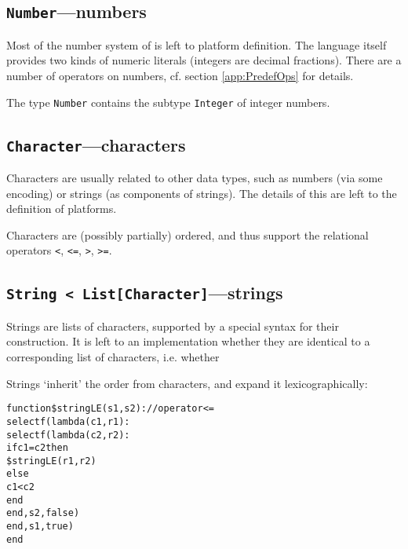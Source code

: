 
\subsection{{\tt Number}---numbers}\label{sect:Numbers}


Most of the number system of \Cal is left to
platform definition. The language itself provides two kinds of
numeric literals (integers are decimal fractions). There are a number
of operators on numbers, cf. section \ref{app:PredefOps} for details.



The type {\tt Number} contains the subtype {\tt Integer} of integer numbers.


\subsection{{\tt Character}---characters}


Characters are usually related to other data types, such as numbers
(via some encoding) or strings (as components of strings). The details
of this are left to the definition of platforms.

Characters are (possibly partially) ordered, and thus support the
relational operators {\tt <}, {\tt <=}, {\tt >}, {\tt >=}.



\subsection{{\tt String < List[Character]}---strings}


Strings are lists of characters, supported by a special syntax for
their construction. It is left to an implementation whether they are
identical to a corresponding list of characters, i.e. whether\\


Strings `inherit' the order from characters, and expand it
lexicographically:
\begin{alltt}function \$stringLE (s1, s2) : // operator <=
    selectf(lambda (c1, r1) :
                selectf(lambda (c2, r2) :
                            if c1 = c2 then
                                \$stringLE(r1, r2)
                            else 
                                c1 < c2
                            end
                        end, s2, false)
            end, s1, true)
end
\end{alltt}

